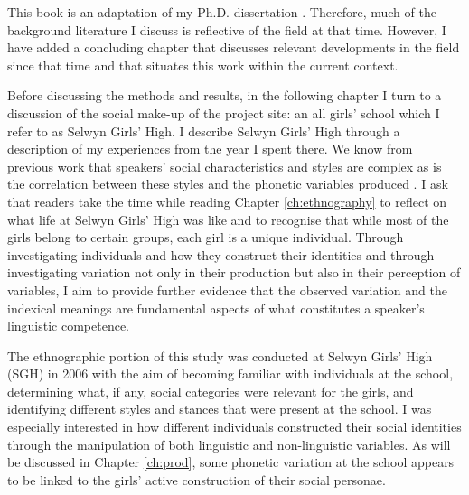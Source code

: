 This book is an adaptation of my Ph.D. dissertation \cite{drager2009-thesis}.  Therefore, much of the background literature I discuss is reflective of the field at that time.  However, I have added a concluding chapter that discusses relevant developments in the field since that time and that situates this work within the current context.

Before discussing the methods and results, in the following chapter I turn to a discussion of the social make-up of the project site: an all girls' school which I refer to as Selwyn Girls' High.  I describe Selwyn Girls' High through a description of my experiences from the year I spent there.  We know from previous work that speakers' social characteristics and styles are complex as is the correlation between these styles and the phonetic variables produced \cite{eckert2005,eckert1996nailpolish,mendozadenton2008,zhang2005}.  I ask that readers take the time while reading Chapter \ref{ch:ethnography} to reflect on what life at Selwyn Girls' High was like and to recognise that while most of the girls belong to certain groups, each girl is a unique individual.  Through investigating individuals and how they construct their identities and through investigating variation not only in their production but also in their perception of variables, I aim to provide further evidence that the observed variation and the indexical meanings are fundamental aspects of what constitutes a speaker's linguistic competence.

The ethnographic portion of this study was conducted at Selwyn Girls' High (SGH) in 2006 with the aim of becoming familiar with individuals at the school, determining what, if any, social categories were relevant for the girls, and identifying different styles and stances that were present at the school.  I was especially interested in how different individuals constructed their social identities through the manipulation of both linguistic and non-linguistic variables.  As will be discussed in Chapter \ref{ch:prod}, some phonetic variation at the school appears to be linked to the girls' active construction of their social personae.  

